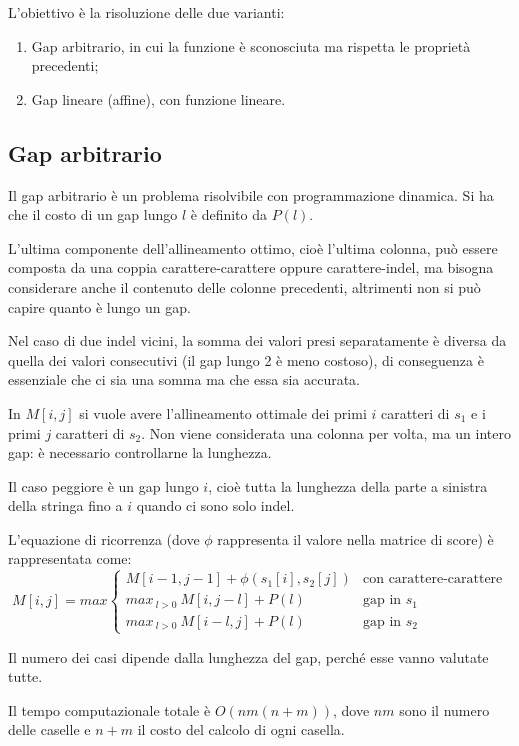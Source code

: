 L'obiettivo è la risoluzione delle due varianti:
\begin{enumerate}
	\item Gap arbitrario, in cui la funzione è sconosciuta ma rispetta le proprietà precedenti;
	\item Gap lineare (affine), con funzione lineare.
\end{enumerate}

\subsection{Gap arbitrario}
Il gap arbitrario è un problema risolvibile con programmazione dinamica. Si ha che il costo di un gap lungo $l$ è definito da $P(l)$.

L'ultima componente dell'allineamento ottimo, cioè l'ultima colonna, può essere composta da una coppia carattere-carattere oppure carattere-indel, ma bisogna considerare anche il contenuto delle colonne precedenti, altrimenti non si può capire quanto è lungo un gap.

Nel caso di due indel vicini, la somma dei valori presi separatamente è diversa da quella dei valori consecutivi (il gap lungo 2 è meno costoso), di conseguenza è essenziale che ci sia una somma ma che essa sia accurata.

In $M[i, j]$ si vuole avere l'allineamento ottimale dei primi $i$ caratteri di $s_1$ e i primi $j$ caratteri di $s_2$. Non viene considerata una colonna per volta, ma un intero gap: è necessario controllarne la lunghezza.

Il caso peggiore è un gap lungo $i$, cioè tutta la lunghezza della parte a sinistra della stringa fino a $i$ quando ci sono solo indel.

L'equazione di ricorrenza (dove $\phi$ rappresenta il valore nella matrice di score) è rappresentata come:
$$M[i, j] = max\begin{cases}
	M[i-1, j-1] + \phi(s_1[i], s_2[j]) & \text{con carattere-carattere} \\
	max_{\ l > 0}\ M[i, j-l] + P(l) & \text{gap in } s_1 \\
	max_{\ l > 0}\ M[i-l, j] + P(l) & \text{gap in } s_2
\end{cases}$$

Il numero dei casi dipende dalla lunghezza del gap, perché esse vanno valutate tutte.

Il tempo computazionale totale è $O(nm(n+m))$, dove $nm$ sono il numero delle caselle e $n+m$ il costo del calcolo di ogni casella.

